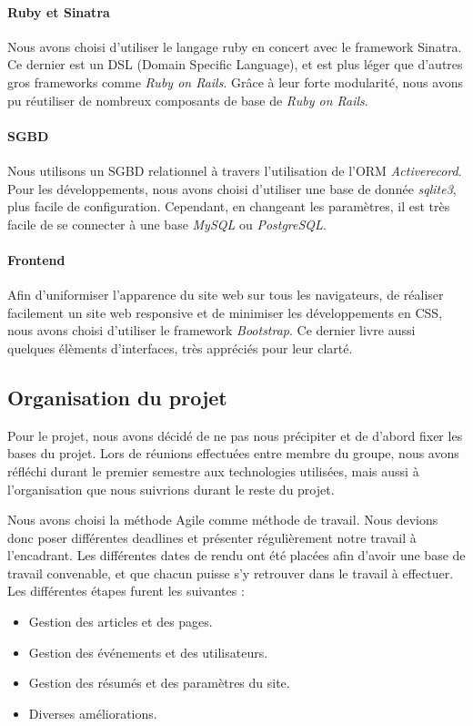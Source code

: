 \documentclass[a4paper,11pt]{article}
\begin{document}
\paragraph*{Ruby et Sinatra} Nous avons choisi d'utiliser le langage ruby en concert avec le framework Sinatra. Ce dernier est un DSL (Domain Specific Language), et est plus léger que d'autres gros frameworks comme \textit{Ruby on Rails}. Grâce à leur forte modularité, nous avons pu réutiliser de nombreux composants de base de \textit{Ruby on Rails}. 

\paragraph{SGBD}
Nous utilisons un SGBD relationnel à travers l'utilisation de l'ORM \textit{Activerecord}. Pour les développements, nous avons choisi d'utiliser une base de donnée \textit{sqlite3}, plus facile de configuration. Cependant, en changeant les paramètres, il est très facile de se connecter à une base \textit{MySQL} ou \textit{PostgreSQL}.

\paragraph{Frontend}
Afin d'uniformiser l'apparence du site web sur tous les navigateurs, de réaliser facilement un site web responsive et de minimiser les développements en CSS, nous avons choisi d'utiliser le framework \textit{Bootstrap}. Ce dernier livre aussi quelques élèments d'interfaces, très appréciés pour leur clarté.

\subsection{Organisation du projet}
Pour le projet, nous avons décidé de ne pas nous précipiter et de d'abord fixer les bases du projet. Lors de réunions effectuées entre membre du groupe, nous avons réfléchi durant le premier semestre aux technologies utilisées, mais aussi à l'organisation que nous suivrions durant le reste du projet. 

Nous avons choisi la méthode Agile comme méthode de travail. Nous devions donc poser différentes deadlines et présenter régulièrement notre travail à l'encadrant. Les différentes dates de rendu ont été placées afin d'avoir une base de travail convenable, et que chacun puisse s'y retrouver dans le travail à effectuer. Les différentes étapes furent les suivantes :

\begin{itemize}
\item Gestion des articles et des pages.
\item Gestion des événements et des utilisateurs.
\item Gestion des résumés et des paramètres du site.
\item Diverses améliorations.
\end{itemize}
\end{document}
